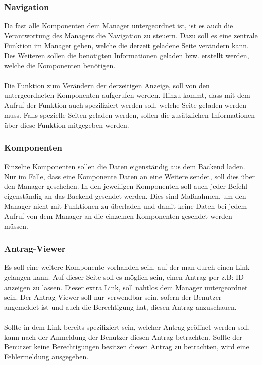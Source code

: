 \subsubsection{Navigation}
Da fast alle Komponenten dem Manager untergeordnet ist, ist es auch die Verantwortung des Managers die Navigation zu steuern. Dazu soll es eine zentrale Funktion im Manager geben, welche die derzeit geladene Seite verändern kann. Des Weiteren sollen die benötigten Informationen geladen bzw. erstellt werden, welche die Komponenten benötigen.
\\\\
Die Funktion zum Verändern der derzeitigen Anzeige, soll von den untergeordneten Komponenten aufgerufen werden. Hinzu kommt, dass mit dem Aufruf der Funktion auch spezifiziert werden soll, welche Seite geladen werden muss. Falls spezielle Seiten geladen werden, sollen die zusätzlichen Informationen über diese Funktion mitgegeben werden.

\subsubsection{Komponenten}
Einzelne Komponenten sollen die Daten eigenständig aus dem Backend laden. Nur im Falle, dass eine Komponente Daten an eine Weitere sendet, soll dies über den Manager geschehen. In den jeweiligen Komponenten soll auch jeder Befehl eigenständig an das Backend gesendet werden. Dies sind Maßnahmen, um den Manager nicht mit Funktionen zu überladen und damit keine Daten bei jedem Aufruf von dem Manager an die einzelnen Komponenten gesendet werden müssen.

\subsubsection{Antrag-Viewer}
Es soll eine weitere Komponente vorhanden sein, auf der man durch einen Link gelangen kann. Auf dieser Seite soll es möglich sein, einen Antrag per z.B: ID anzeigen zu lassen. Dieser extra Link, soll nahtlos dem Manager untergeordnet sein. Der Antrag-Viewer soll nur verwendbar sein, sofern der Benutzer angemeldet ist und auch die Berechtigung hat, diesen Antrag anzuschauen.
\\\\
Sollte in dem Link bereits spezifiziert sein, welcher Antrag geöffnet werden soll, kann nach der Anmeldung der Benutzer diesen Antrag betrachten. Sollte der Benutzer keine Berechtigungen besitzen diesen Antrag zu betrachten, wird eine Fehlermeldung ausgegeben.

